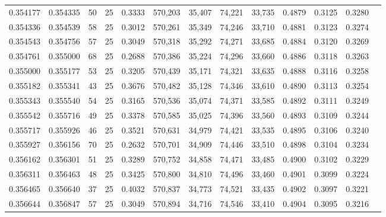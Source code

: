 \begin{tabular}{rrrrrrrrrrrrr}
0.354177 & 0.354335 &    50 &  25 &                                     0.3333 & 570,203 &  35,407 &  74,221 &  33,735 & 0.4879 & 0.3125 & 0.3280 \\
0.354336 & 0.354539 &    58 &  25 &                                     0.3012 & 570,261 &  35,349 &  74,246 &  33,710 & 0.4881 & 0.3123 & 0.3274 \\
0.354543 & 0.354756 &    57 &  25 &                                     0.3049 & 570,318 &  35,292 &  74,271 &  33,685 & 0.4884 & 0.3120 & 0.3269 \\
0.354761 & 0.355000 &    68 &  25 &                                     0.2688 & 570,386 &  35,224 &  74,296 &  33,660 & 0.4886 & 0.3118 & 0.3263 \\
0.355000 & 0.355177 &    53 &  25 &                                     0.3205 & 570,439 &  35,171 &  74,321 &  33,635 & 0.4888 & 0.3116 & 0.3258 \\
0.355182 & 0.355341 &    43 &  25 &                                     0.3676 & 570,482 &  35,128 &  74,346 &  33,610 & 0.4890 & 0.3113 & 0.3254 \\
0.355343 & 0.355540 &    54 &  25 &                                     0.3165 & 570,536 &  35,074 &  74,371 &  33,585 & 0.4892 & 0.3111 & 0.3249 \\
0.355542 & 0.355716 &    49 &  25 &                                     0.3378 & 570,585 &  35,025 &  74,396 &  33,560 & 0.4893 & 0.3109 & 0.3244 \\
0.355717 & 0.355926 &    46 &  25 &                                     0.3521 & 570,631 &  34,979 &  74,421 &  33,535 & 0.4895 & 0.3106 & 0.3240 \\
0.355927 & 0.356156 &    70 &  25 &                                     0.2632 & 570,701 &  34,909 &  74,446 &  33,510 & 0.4898 & 0.3104 & 0.3234 \\
0.356162 & 0.356301 &    51 &  25 &                                     0.3289 & 570,752 &  34,858 &  74,471 &  33,485 & 0.4900 & 0.3102 & 0.3229 \\
0.356311 & 0.356463 &    48 &  25 &                                     0.3425 & 570,800 &  34,810 &  74,496 &  33,460 & 0.4901 & 0.3099 & 0.3224 \\
0.356465 & 0.356640 &    37 &  25 &                                     0.4032 & 570,837 &  34,773 &  74,521 &  33,435 & 0.4902 & 0.3097 & 0.3221 \\
0.356644 & 0.356847 &    57 &  25 &                                     0.3049 & 570,894 &  34,716 &  74,546 &  33,410 & 0.4904 & 0.3095 & 0.3216 \\

\end{tabular}
